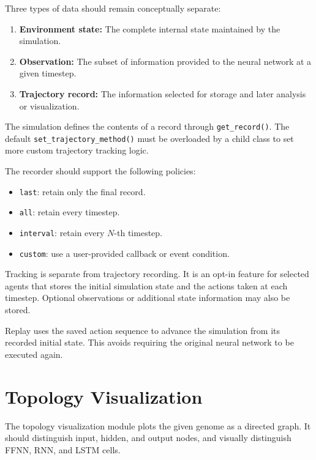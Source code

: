 \documentclass[11pt]{article}
\begin{document}
Three types of data should remain conceptually separate:

\begin{enumerate}
    \item \textbf{Environment state:} The complete internal state
    maintained by the simulation.
    \item \textbf{Observation:} The subset of information provided to
    the neural network at a given timestep.
    \item \textbf{Trajectory record:} The information selected for
    storage and later analysis or visualization.
\end{enumerate}

The simulation defines the contents of a record through
\texttt{get\_record()}. The default \texttt{set\_trajectory\_method()} must be overloaded by a child class to set more custom trajectory tracking logic.

The recorder should support the following policies:

\begin{itemize}
    \item \texttt{last}: retain only the final record.
    \item \texttt{all}: retain every timestep.
    \item \texttt{interval}: retain every \(N\)-th timestep.
    \item \texttt{custom}: use a user-provided callback or event condition.
\end{itemize}

Tracking is separate from trajectory recording. It is an opt-in feature
for selected agents that stores the initial simulation state and the
actions taken at each timestep. Optional observations or additional
state information may also be stored.

Replay uses the saved action sequence to advance the simulation from
its recorded initial state. This avoids requiring the original neural
network to be executed again.

\section{Topology Visualization}

The topology visualization module plots the given genome as a
directed graph. It should distinguish input, hidden, and output nodes,
and visually distinguish FFNN, RNN, and LSTM cells.
\end{document}
